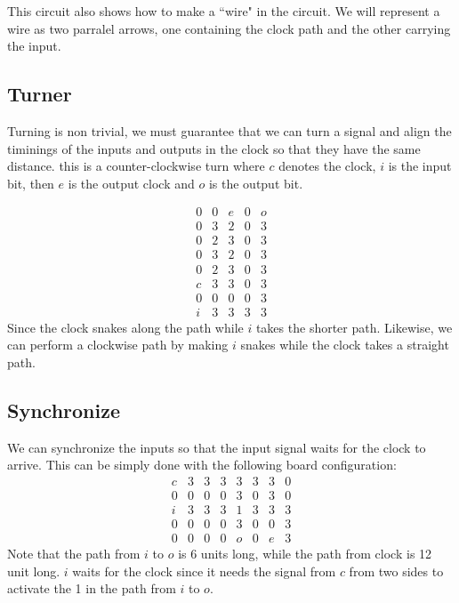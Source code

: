 \documentclass[runningheads,a4paper]{llncs}
\begin{document}
This circuit also shows how to make a ``wire" in the circuit. We will represent a wire as two parralel arrows, one containing the clock path and the other carrying the input. 

\subsection{Turner}

Turning is non trivial, we must guarantee that we can turn a signal and align the timinings of the inputs and outputs in the clock so that they have the same distance. this is a counter-clockwise turn where $c$ denotes the clock, $i$ is the input bit, then $e$ is the output clock and $o$ is the output bit.

\[ \begin{array}{cccccc} 0 & 0 & e & 0 & o \\
				     0 & 3 & 2 & 0 & 3 \\
			            0 & 2 & 3 & 0 & 3 \\
				    0 & 3 & 2 & 0 & 3 \\
				    0 & 2 & 3 & 0 & 3 \\
				    c & 3 & 3 & 0 & 3 \\
				    0 & 0 & 0 & 0 & 3 \\
				    i & 3 & 3 & 3 & 3 \end{array} \]	
Since the clock snakes along the path while $i$ takes the shorter path. 
Likewise, we can perform a clockwise path by making $i$ snakes while the clock takes a straight path. 

\subsection{Synchronize}

We can synchronize the inputs so that the input signal waits for the clock to arrive. This can be simply done with the following board configuration:
\[ \begin{array}{cccccccc} c & 3 & 3 & 3 & 3 & 3 & 3 & 0 \\
					 0 & 0 & 0 & 0 & 3 & 0 & 3 & 0 \\
					 i  & 3 & 3 & 3 & 1 & 3 & 3 & 3 \\
					 0 & 0 & 0 & 0 & 3 & 0 & 0 & 3 \\
					 0 & 0 & 0 & 0 & o & 0 & e & 3 \end{array} \]
Note that the path from $i$ to $o$ is 6 units long, while the path from clock is 12 unit long. $i$ waits for the clock since it needs the signal from $c$ from two sides to activate the 1 in the path from $i$ to $o$.
\end{document}

